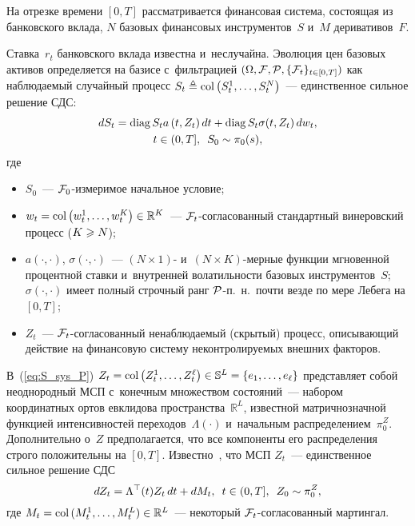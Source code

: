 \begin{multicols}{2}
  На отрезке времени $[0,T]$ рассматривается финансовая сис\-те\-ма, со\-сто\-ящая из
  банковского вклада,
$N$ базовых финансовых инструментов~$S$ и~$M$ деривативов~$F$.

  Ставка~$r_t$ банковского вклада известна и~неслучайна.
  Эволюция цен базовых активов определяется на базисе с~фильтрацией $(\Omega, {\mathcal F}, {\mathcal P}, \{{\mathcal F}_t\}_{t \in [0,T]})$ 
  как наблюдаемый случайный процесс $S_t \hm\ebd \mathrm{col}\left(S_t^1,\ldots,S_t^N\right)$~--- единственное сильное решение СДС:
  \begin{multline}
  dS_t = \mathrm{diag}\, S_t a\left(t,Z_t\right)dt + \mathrm{diag}\, S_t \sigma(t,Z_t)\,dw_t,\\ t \in (0,T], \enskip S_0 \sim \pi_0(s),
  \label{eq:S_sys_P}
  \end{multline}
  где
  \begin{itemize}
  \item   $S_0$~--- ${\mathcal F}_0$-из\-ме\-ри\-мое начальное условие;
  \item
  $w_t = \mathrm{col}\left(w_t^1,\ldots,w_t^K\right)\hm \in \mathbb{R}^K$~--- ${\mathcal F}_t$-со\-гла\-со\-ван\-ный стандартный винеровский процесс ($K \hm\geqslant N$);
  \item
  $a(\cdot,\cdot)$, $\sigma(\cdot,\cdot)$~--- $(N \times 1)$- и~$(N \times K)$-мер\-ные 
  функции мгновенной процентной ставки  и~внутренней волатильности базовых инструментов~$S$; 
  $\sigma(\cdot,\cdot)$ имеет полный строчный ранг ${\mathcal P}$-п.~н.\ почти везде по мере Лебега на $[0,T]$;
  \item
  $Z_t$~--- ${\mathcal F}_t$-со\-гла\-со\-ван\-ный ненаблюдаемый (скрытый) процесс, описывающий действие на финансовую систему неконтролируемых внешних факторов.
  \end{itemize}
 
 В~(\ref{eq:S_sys_P}) $Z_t \hm= \mathrm{col}\left(Z_t^1, \ldots, Z_t^{\ell}\right) \hm\in \mathbb{S}^L\hm = \{e_1,\ldots, e_{\ell}\}$ 
 представляет собой неоднородный МСП с~конечным множеством состояний~--- набором координатных ортов евклидова пространства~$\mathbb{R}^L$, 
 известной мат\-рич\-но\-знач\-ной функцией интенсивностей переходов~$\Lambda(\cdot)$ и~начальным распределением~$\pi_0^Z$. 
 Дополнительно о~$Z$ предполагается, что все компоненты его распределения строго положительны на $[0,T]$. Известно~\cite{EAM_10}, что
  МСП $Z_t$~--- единственное сильное решение СДС
  \begin{equation}
  dZ_t = \Lambda^{\top}(t)Z_t\,dt + dM_t,\enskip t \in (0,T], \enskip Z_0 \sim \pi_0^Z,
  \label{eq:Z_sys}
  \end{equation}
  где
  $M_t = \mathrm{col}\,(M_t^1,\ldots,M_t^L) \hm\in \mathbb{R}^L$~--- некоторый ${\mathcal F}_t$-со\-гла\-со\-ван\-ный мартингал.
  


\end{multicols}
